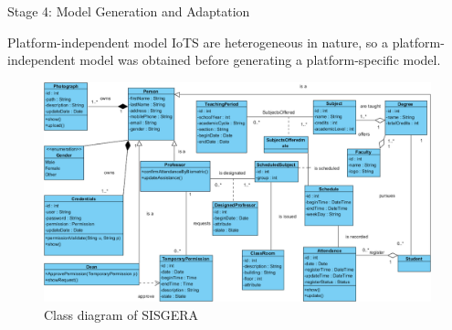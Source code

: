 \documentclass[notes=show, 10pt, xcolor=table]{beamer}
\begin{document}
     \begin{frame}{Stage 4: Model Generation and Adaptation}
        \begin{block}{Platform-independent model}
            IoTS are heterogeneous in nature, so a platform-independent model was obtained before generating a platform-specific model.
        \end{block}
        \begin{figure}
            \centering
            \includegraphics[scale=0.65]{classesDiagram.png}
            \caption{Class diagram of SISGERA}
            \label{fig:classesDiagram}
        \end{figure}
    \end{frame}
    
\end{document}
